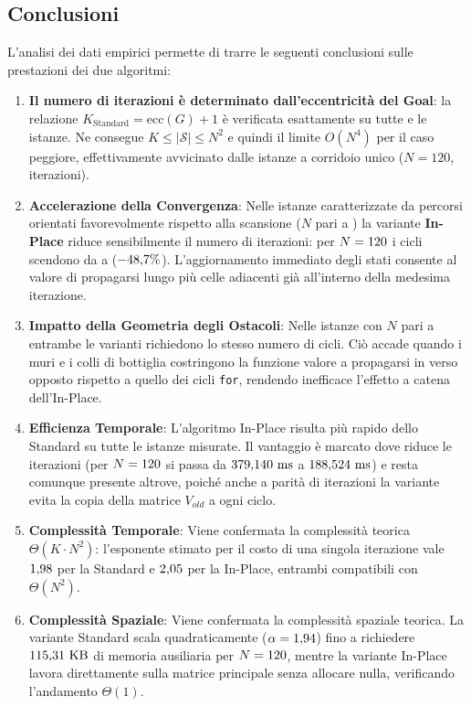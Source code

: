 \clearpage
\subsection{Conclusioni}
L'analisi dei dati empirici permette di trarre le seguenti conclusioni sulle prestazioni dei due algoritmi:

\begin{enumerate}
    \item \textbf{Il numero di iterazioni è determinato dall'eccentricità del Goal}: la relazione $K_{\text{Standard}} = \text{ecc}(G) + 1$ è verificata esattamente su tutte e \benchNistanze{} le istanze. Ne consegue $K \le |\mathcal{S}| \le N^2$ e quindi il limite $O(N^4)$ per il caso peggiore, effettivamente avvicinato dalle istanze a corridoio unico ($N=120$, \benchKtop{} iterazioni).

    \item \textbf{Accelerazione della Convergenza}: Nelle istanze caratterizzate da percorsi orientati favorevolmente rispetto alla scansione ($N$ pari a \benchIstanzeKridotto{}) la variante \textbf{In-Place} riduce sensibilmente il numero di iterazioni: per $N=120{}$ i cicli scendono da \benchKstdGrande{} a \benchKipGrande{} ($-48{,}7{}\%$). L'aggiornamento immediato degli stati consente al valore di propagarsi lungo più celle adiacenti già all'interno della medesima iterazione.

    \item \textbf{Impatto della Geometria degli Ostacoli}: Nelle istanze con $N$ pari a \benchIstanzeKpari{} entrambe le varianti richiedono lo stesso numero di cicli. Ciò accade quando i muri e i colli di bottiglia costringono la funzione valore a propagarsi in verso opposto rispetto a quello dei cicli \texttt{for}, rendendo inefficace l'effetto a catena dell'In-Place.

    \item \textbf{Efficienza Temporale}: L'algoritmo In-Place risulta più rapido dello Standard su tutte le istanze misurate. Il vantaggio è marcato dove riduce le iterazioni (per $N=120{}$ si passa da $379{,}140{}\text{ ms}$ a $188{,}524{}\text{ ms}$) e resta comunque presente altrove, poiché anche a parità di iterazioni la variante evita la copia della matrice $V_{old}$ a ogni ciclo.

    \item \textbf{Complessità Temporale}: Viene confermata la complessità teorica $\Theta(K \cdot N^2)$: l'esponente stimato per il costo di una singola iterazione vale $1{,}98{}$ per la Standard e $2{,}05{}$ per la In-Place, entrambi compatibili con $\Theta(N^2)$.

    \item \textbf{Complessità Spaziale}: Viene confermata la complessità spaziale teorica. La variante Standard scala quadraticamente ($\alpha = 1{,}94{}$) fino a richiedere $115{,}31{}\text{ KB}$ di memoria ausiliaria per $N=120{}$, mentre la variante In-Place lavora direttamente sulla matrice principale senza allocare nulla, verificando l'andamento $\Theta(1)$.
\end{enumerate}
